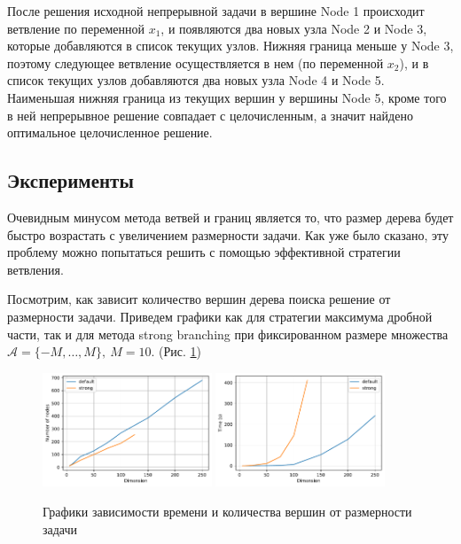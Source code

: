 \documentclass[12pt]{article}
\begin{document}
После решения исходной непрерывной задачи в вершине Node 1 происходит ветвление по переменной $x_1$, и появляются два новых узла Node 2 и Node 3, которые добавляются в список текущих узлов. Нижняя граница меньше у Node 3, поэтому следующее ветвление осуществляется в нем (по переменной $x_2$), и в список текущих узлов добавляются два новых узла Node 4 и Node 5. Наименьшая нижняя граница из текущих вершин у вершины Node 5, кроме того в ней непрерывное решение совпадает с целочисленным, а значит найдено оптимальное целочисленное решение.

\subsection{Эксперименты}
Очевидным минусом метода ветвей и границ является то, что размер дерева будет быстро возрастать с увеличением размерности задачи. Как уже было сказано, эту проблему можно попытаться решить с помощью эффективной стратегии ветвления.

Посмотрим, как зависит количество вершин дерева поиска решение от размерности задачи. Приведем графики как для стратегии максимума дробной части, так и для метода strong branching при фиксированном размере множества $\mathcal{A} = \{-M, \ldots, M\}, \ M = 10$. (Рис. \ref{branch_and_bound_dim})

\begin{figure}[H]
    \centering
    \includegraphics[width=0.45\textwidth]{branch_and_bound_n_nodes_dim.pdf}
    \quad
    \includegraphics[width=0.45\textwidth]{branch_and_bound_time_dim.pdf}
    \caption{Графики зависимости времени и количества вершин от размерности задачи}
    \label{branch_and_bound_dim}
\end{figure}
\end{document}
